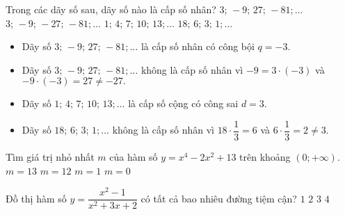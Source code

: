 \begin{ex}[1D3Y4-1]%
	Trong các dãy số sau, dãy số nào là cấp số nhân?
	\choice
	{\True $3; \, -9; \, 27; \, -81;\ldots$}
	{$3; \, -9; \, - 27; \, -81;\ldots$}
	{$1; \, 4; \, 7; \, 10;\, 13;\ldots$}
	{$18; \, 6; \, 3; \, 1;\ldots$}
	\loigiai
	{
		\begin{itemize}
			\item Dãy số $3; \, -9; \, 27; \, -81;\ldots$ là cấp số nhân có công bội $ q = -3. $
			\item Dãy số $3; \, -9; \, 27; \, -81;\ldots$ không là cấp số nhân vì $ -9 = 3 \cdot (-3)$ và $ -9 \cdot (-3) = 27 \ne -27.$
			\item Dãy số $1; \, 4; \, 7; \, 10;\, 13;\ldots$ là cấp số cộng có công sai $ d = 3. $
			\item Dãy số $18; \, 6; \, 3; \, 1;\ldots$ không là cấp số nhân vì $ 18 \cdot \dfrac{1}{3} = 6 $ và $ 6 \cdot \dfrac{1}{3} = 2 \ne 3. $
		\end{itemize}
	}
\end{ex}
\begin{ex}[2D1B3-2]%
	Tìm giá trị nhỏ nhất $m$ của hàm số $y=x^4-2x^2+13$ trên khoảng $(0;+\infty)$.
	\choice
	{$m=13$}
	{\True $m=12$}
	{$m=1$}
	{$m=0$}
\end{ex}

\begin{ex}[2D1B4-1]%
	Đồ thị hàm số $y=\dfrac{x^2-1}{x^2+3x+2}$ có tất cả bao nhiêu đường tiệm cận?
	\choice
	{$1$}
	{\True $2$}
	{$3$}
	{$4$}
\end{ex}

